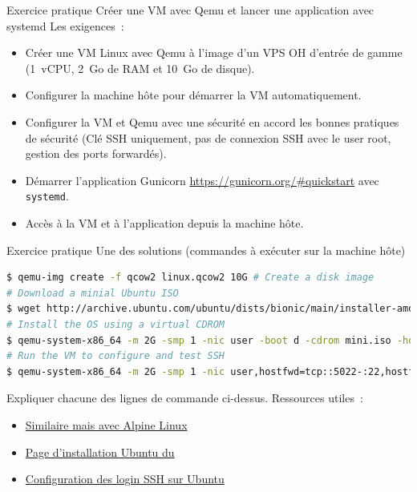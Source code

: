 \documentclass{beamer}
\begin{document}
    \begin{frame}{Exercice pratique \execcounterdispinc{}}{Créer une VM avec Qemu et lancer une application avec systemd}
        Les exigences~:
        \begin{itemize}
            \item Créer une VM Linux avec Qemu à l'image d'un VPS OH d'entrée de gamme (1~vCPU, 2~Go de RAM et 10~Go de disque).
            \item Configurer la machine hôte pour démarrer la VM automatiquement.
            \item Configurer la VM et Qemu avec une sécurité en accord les bonnes pratiques de sécurité (Clé SSH uniquement, pas de connexion SSH avec le user root, gestion des ports forwardés).
            \item Démarrer l'application Gunicorn  \url{https://gunicorn.org/\#quickstart} avec \lstinline{systemd}.
            \item Accès à la VM et à l'application depuis la machine hôte.
        \end{itemize}
    \end{frame}

    \begin{frame}[fragile]{Exercice pratique \execcounterdispinc{}}{Une des solutions (commandes à exécuter sur la machine hôte)}
        \begin{lstlisting}[language=bash]
$ qemu-img create -f qcow2 linux.qcow2 10G # Create a disk image
# Download a minial Ubuntu ISO
$ wget http://archive.ubuntu.com/ubuntu/dists/bionic/main/installer-amd64/current/images/netboot/mini.iso
# Install the OS using a virtual CDROM
$ qemu-system-x86_64 -m 2G -smp 1 -nic user -boot d -cdrom mini.iso -hda linux.qcow2 -k fr -enable-kvm
# Run the VM to configure and test SSH
$ qemu-system-x86_64 -m 2G -smp 1 -nic user,hostfwd=tcp::5022-:22,hostfwd=tcp::5080-:80 -display none -hda linux.qcow2 -k fr -enable-kvm
        \end{lstlisting}
        Expliquer chacune des lignes de commande ci-dessus.
        \bigbreak
        Ressources utiles~:
        \begin{itemize}
            \item \href{https://wiki.alpinelinux.org/wiki/Install_Alpine_in_QEMU}{Similaire mais avec Alpine Linux}
            \item \href{https://help.ubuntu.com/community/Installation/MinimalCD\#A64-bit_PC_.28amd64.2C_x86_64.29_.28Recommended.29}{Page d'installation Ubuntu du  }
            \item \href{https://phoenixnap.com/kb/generate-setup-ssh-key-ubuntu}{Configuration des login SSH sur Ubuntu}
        \end{itemize}
    \end{frame}
\end{document}
